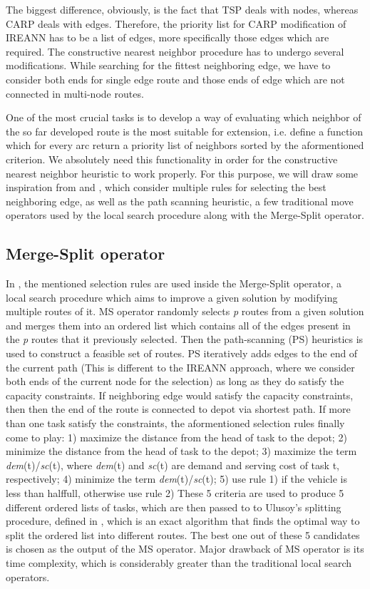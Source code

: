 \documentclass[oneside]{ctuthesis}
\theoremstyle{plain}
\theoremstyle{definition}
\theoremstyle{note}
\begin{document}
The biggest difference, obviously, is the fact that TSP deals with nodes, whereas CARP deals with edges. Therefore, the priority list for CARP modification of IREANN has to be a list of edges, more specifically those edges which are required. The constructive nearest neighbor procedure has to undergo several modifications. While searching for the fittest neighboring edge, we have to consider both ends for single edge route and those ends of edge which are not connected in multi-node routes.

One of the most crucial tasks is to develop a way of evaluating which neighbor of the so far developed route is the most suitable for extension, i.e. define a function which for every arc return a priority list of neighbors sorted by the aformentioned criterion. We absolutely need this functionality in order for the constructive nearest neighbor heuristic to work properly. For this purpose, we will draw some inspiration from \cite{5200351} and \cite{ULUSOY1985329}, which consider multiple rules for selecting the best neighboring edge, as well as the path scanning heuristic, a few traditional move operators used by the local search procedure along with the Merge-Split operator.

\subsection{Merge-Split operator}
In \cite{5200351}, the mentioned selection rules are used inside the Merge-Split operator, a local search procedure which aims to improve a given solution by modifying multiple routes of it. MS operator randomly selects \emph{p} routes from a given solution and merges them into an ordered list which contains all of the edges present in the \emph{p} routes that it previously selected. Then the path-scanning (PS) heuristics is used to construct a feasible set of routes. PS iteratively adds edges to the end of the current path (This is different to the IREANN approach, where we consider both ends of the current node for the selection) as long as they do satisfy the capacity constraints. If neighboring edge would satisfy the capacity constraints, then then the end of the route is connected to depot via shortest path. If more than one task satisfy the constraints, the aformentioned selection rules finally come to play: 1) maximize
the distance from the head of task to the depot; 2) minimize
the distance from the head of task to the depot; 3) maximize
the term \emph{dem}(t)/\emph{sc}(t), where \emph{dem}(t) and \emph{sc}(t) are demand
and serving cost of task t, respectively; 4) minimize the term
\emph{dem}(t)/\emph{sc}(t); 5) use rule 1) if the vehicle is less than halffull, otherwise use rule 2)
These 5 criteria are used to produce 5 different ordered lists of tasks, which are then passed to to Ulusoy's splitting procedure, defined in \cite{ULUSOY1985329}, which is an exact algorithm that finds the optimal way to split the ordered list into different routes. The best one out of these 5 candidates is chosen as the output of the MS operator. Major drawback of MS operator is its time complexity, which is considerably greater than the traditional local search operators.
\end{document}

